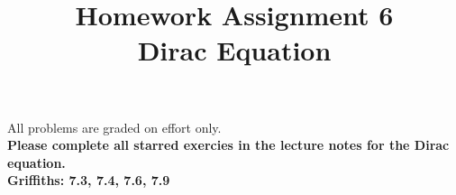 \documentclass[12pt]{article}
\begin{document}
\newcommand{\ihbar}{\ensuremath{i \hbar}}
\newcommand{\dPsidt}{\ensuremath{ \frac{\partial \Psi}{\partial t} }}
\newcommand{\dPsidx}{\ensuremath{ \frac{\partial \Psi}{\partial x} }}
\newcommand{\ddPsidx}{\ensuremath{ \frac{\partial^2 \Psi}{\partial x^2} }}
\newcommand{\dPssdt}{\ensuremath{ \frac{\partial \Psi^*}{\partial t} }}
\newcommand{\dPssdx}{\ensuremath{ \frac{\partial \Psi^*}{\partial x} }}
\newcommand{\ddPssdx}{\ensuremath{ \frac{\partial^2 \Psi^*}{\partial x^2} }}

\newcommand{\dphidt}{\ensuremath{ \frac{d \phi}{dt} }}
\newcommand{\dpsidx}{\ensuremath{ \frac{d \psi}{dx} }}
\newcommand{\ddpsidx}{\ensuremath{ \frac{d^2 \psi}{dx^2} }}


\date{\vspace{-5ex}}

\title{Homework Assignment 6 \\ Dirac Equation }

\maketitle

\noindent
All problems are graded on effort only.\\

\noindent
{\bf Please complete all starred exercies in the lecture notes for the Dirac equation.}\\[5pt]

\noindent
{\bf Griffiths: 7.3, 7.4, 7.6, 7.9}\\[5pt]
\end{document}
